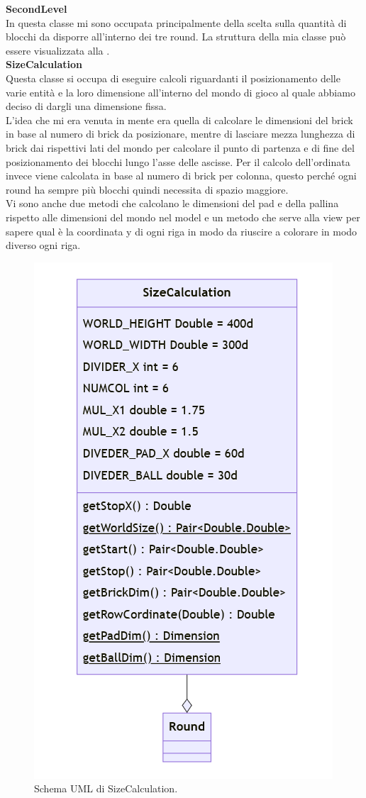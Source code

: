 \documentclass[a4paper,12pt]{report}
\begin{document}
\textbf{SecondLevel}\\
In questa classe mi sono occupata principalmente della scelta sulla quantità di blocchi da disporre all'interno dei tre round. La struttura della mia classe può essere
visualizzata alla .\\
\textbf{SizeCalculation}\\
Questa classe si occupa di eseguire calcoli riguardanti il posizionamento delle varie entità e la loro dimensione all'interno del mondo di gioco al
quale abbiamo deciso di dargli una dimensione fissa.
\\L'idea che mi era venuta in mente era quella di calcolare le dimensioni del brick in base al numero di brick da posizionare, mentre di lasciare mezza lunghezza di brick dai rispettivi
lati del mondo per calcolare il punto di partenza e di fine del posizionamento dei blocchi lungo l'asse delle ascisse. Per il calcolo dell'ordinata invece viene calcolata in base al numero di brick per colonna,
questo perché ogni round ha sempre più blocchi quindi necessita di spazio maggiore.
\\Vi sono anche due metodi che calcolano le dimensioni del pad e della pallina rispetto alle dimensioni del mondo nel model e un metodo che serve alla view per sapere qual è
la coordinata y di ogni riga in modo da riuscire a colorare in modo diverso ogni riga.
\begin{figure}[H]
    \centering{}
    \includegraphics[scale=0.5]{images/SizeCalculation.png}
    \caption{Schema UML di SizeCalculation.}
    \label{images:SizeCalculation}
\end{figure}
\end{document}
